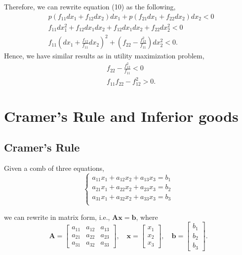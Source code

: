 \documentclass[12pt]{article}
\begin{document}
Therefore, we can rewrite equation (10) as the following,
\begin{align}
				&p(f_{11}dx_1 + f_{12}dx_2)dx_1 + p(f_{21}dx_1 + f_{22}dx_2)dx_2 <0\\
				&f_{11}dx_1^{2} + f_{12}dx_1dx_2 + f_{12}dx_1dx_2 + f_{22}dx_2^{2} <0\\
				&f_{11}\left( dx_1 + \frac{f_{12}}{f_{11}}dx_2 \right) ^{2} + 
				\left( f_{22} - \frac{f_{12}^{2}}{f_{11}} \right) dx_2^{2} < 0.
\end{align}
Hence, we have similar results as in utility maximization problem,
\begin{align}
				&f_{22} - \frac{f_{12}^{2}}{f_{11}} <0\\
				&f_{11}f_{22} - f_{12}^{2} > 0.
\end{align}




\section{Cramer's Rule and Inferior goods}

\subsection{Cramer's Rule}

Given a comb of three equations,
\begin{equation}
				\begin{cases}
					a_{11}x_1 + a_{12}x_2 + a_{13}x_3 = b_1\\
					a_{21}x_1 + a_{22}x_2 + a_{23}x_3 = b_2\\
					a_{31}x_1 + a_{32}x_2 + a_{33}x_3 = b_3\\
				\end{cases}
\end{equation}

we can rewrite in matrix form, i.e., $ \bm{A}\bm{x} = \bm{b} $,
where
\begin{equation}
				\bm{A} = 
				\begin{bmatrix}
				a_{11} & a_{12} & a_{13} \\
				a_{21} & a_{22} & a_{23} \\
				a_{31} & a_{32} & a_{33} 
				\end{bmatrix}, \quad
				\bm{x} = 
				\begin{bmatrix}
				x_1 \\
				x_2 \\
				x_3
				\end{bmatrix}, \quad
				\bm{b} = 
				\begin{bmatrix}
				b_1 \\
				b_2 \\
				b_3
				\end{bmatrix}.
\end{equation}
\end{document}
